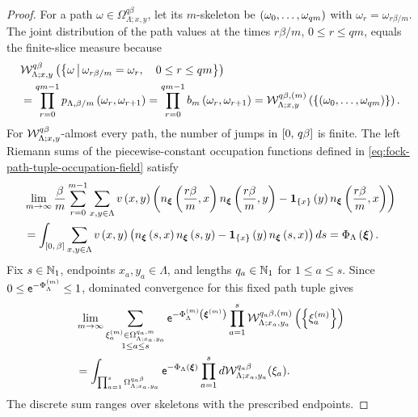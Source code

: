 \documentclass[11pt,a4paper]{article}
\theoremstyle{plain}
\theoremstyle{definition}
\theoremstyle{remark}
\begin{document}
\begin{proof}
For a path $\omega\in\Omega_{\Lambda;x,y}^{q\beta}$, let its $m$-skeleton be
$\left( \omega_0,\ldots,\omega_{qm} \right)$ with $\omega_r=\omega_{r\beta/m}$.
The joint distribution of the path values at the times $r\beta/m$, $0\leq r\leq qm$, equals the finite-slice
measure because
$$\begin{aligned}
&
\mathcal{W}_{\Lambda;x,y}^{q\beta} \left( 
\left\{\omega \, \middle| \, \omega_{r\beta/m}=\omega_r,\quad 0\leq r\leq qm\right\} \right)
\\
& =
\prod_{r = 0}^{qm-1}
p_{\Lambda,\beta/m} \left( \omega_r,\omega_{r+1} \right)
=
\prod_{r = 0}^{qm-1}
b_m \left( \omega_r,\omega_{r+1} \right)
=
\mathcal{W}_{\Lambda;x,y}^{q\beta,(m)} \left( 
\left\{ \left( \omega_0,\ldots,\omega_{qm} \right) \right\} \right).
\end{aligned}$$
For $\mathcal{W}_{\Lambda;x,y}^{q\beta}$-almost every path, the number of jumps in
$\left[ 0,\,q\beta \right]$ is finite.
The left Riemann sums of the piecewise-constant occupation functions defined in
\eqref{eq:fock-path-tuple-occupation-field} satisfy
$$\begin{aligned}
&
\lim_{m \to \infty}
\frac{\sminvtemperature}{m}
\sum_{r = 0}^{m-1}
\sum_{x,y\in\Lambda}
\fun{v}{x,y}
\rbk{
\fun{n_{\boldsymbol{\xi}}}{\frac{r\beta}{m},x}
\fun{n_{\boldsymbol{\xi}}}{\frac{r\beta}{m},y}
-
\fun{\fndef{\setone{x}}}{y}
\fun{n_{\boldsymbol{\xi}}}{\frac{r\beta}{m},x}}
\\ %
& =
\int_{\closedinterval{0}{\beta}}
\sum_{x,y\in\Lambda}
\fun{v}{x,y}
\rbk{
\fun{n_{\boldsymbol{\xi}}}{s,x}
\fun{n_{\boldsymbol{\xi}}}{s,y}
-
\fun{\fndef{\setone{x}}}{y}
\fun{n_{\boldsymbol{\xi}}}{s,x}}
\opdmsr{s}
=
\fun{\Phi_{\Lambda}}{\boldsymbol{\xi}}.
\end{aligned}$$
Fix $s\in\mathbb{N}_1$, endpoints $x_a,y_a\in\Lambda$, and lengths
$q_a\in\mathbb{N}_1$ for $1\leq a\leq s$.
Since $0 \leq \mathsf{e}^{-\Phi_{\Lambda}^{(m)}} \leq 1$,
dominated convergence for this fixed path tuple gives
\begin{equation}
\begin{aligned}
&
\lim_{m \to \infty}
\sum_{\substack{
\xi_a^{(m)}\in\Omega_{\Lambda;x_a,y_a}^{q_a,m}\\
1\leq a\leq s}}
\napiernum^{-\fun{\Phi_{\Lambda}^{(m)}}{\boldsymbol{\xi}^{(m)}}}
\prod_{a=1}^{s}
\fun{\msrcal{W}_{\Lambda;x_a,y_a}^{q_a\beta,(m)}}{
\setone{\xi_a^{(m)}}}
\\ %
& =
\int_{\prod_{a=1}^{s}\Omega_{\Lambda;x_a,y_a}^{q_a\beta}}
\napiernum^{-\fun{\Phi_{\Lambda}}{\boldsymbol{\xi}}}
\prod_{a=1}^{s}
\opdmsr{\msrcal{W}_{\Lambda;x_a,y_a}^{q_a\beta}}(\xi_a).
\end{aligned}
\label{eq:fock-fixed-tuple-skeleton-limit}
\end{equation}
The discrete sum ranges over skeletons with the prescribed endpoints.


\end{proof}
\end{document}
